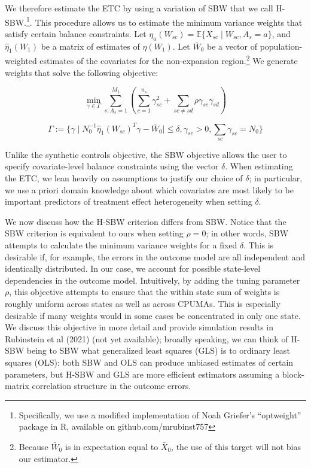 \documentclass[12pt]{article}
\begin{document}
We therefore estimate the ETC by using a variation of SBW that we call H-SBW.\footnote{Specifically, we use a modified implementation of Noah Griefer's ``optweight'' package in R, available on github.com/mrubinst757}. This procedure allows us to estimate the minimum variance weights that satisfy certain balance constraints. Let $\eta_a(W_{sc}) = \mathbb{E}\{X_{sc} \mid W_{sc}, A_s = a\}$, and $\hat{\eta}_1(W_1)$ be a matrix of estimates of $\eta(W_1)$. Let $\bar{W}_0$ be a vector of population-weighted estimates of the covariates for the non-expansion region.\footnote{Because $\bar{W}_0$ is in expectation equal to $\bar{X}_0$, the use of this target will not bias our estimator.} We generate weights that solve the following objective:

$$
\min_{\gamma \in \Gamma} \sum_{s: A_s = 1}^{M_1}(\sum_{c = 1}^{n_s} \gamma_{sc}^2 + \sum_{sc \ne sd}\rho \gamma_{sc}\gamma_{sd})
$$

$$
\Gamma := \{\gamma \mid N_0^{-1}\hat{\eta}_1(W_{sc})^T\gamma - \bar{W}_0 \mid \le \delta, \gamma_{sc} > 0, \sum_{sc}\gamma_{sc} = N_0\}
$$

Unlike the synthetic controls objective, the SBW objective allows the user to specify covariate-level balance constraints using the vector $\delta$. When estimating the ETC, we lean heavily on assumptions to justify our choice of $\delta$; in particular, we use a priori domain knowledge about which covariates are most likely to be important predictors of treatment effect heterogeneity when setting $\delta$. 

We now discuss how the H-SBW criterion differs from SBW. Notice that the SBW criterion is equivalent to ours when setting $\rho = 0$; in other words, SBW attempts to calculate the minimum variance weights for a fixed $\delta$. This is desirable if, for example, the errors in the outcome model are all independent and identically distributed. In our case, we account for possible state-level dependencies in the outcome model. Intuitively, by adding the tuning parameter $\rho$, this objective attempts to ensure that the within state sum of weights is roughly uniform across states as well as across CPUMAs. This is especially desirable if many weights would in some cases be concentrated in only one state. We discuss this objective in more detail and provide simulation results in Rubinstein et al (2021) (not yet available); broadly speaking, we can think of H-SBW being to SBW what generalized least squares (GLS) is to ordinary least squares (OLS): both SBW and OLS can produce unbiased estimates of certain parameters, but H-SBW and GLS are more efficient estimators assuming a block-matrix correlation structure in the outcome errors.
\end{document}

